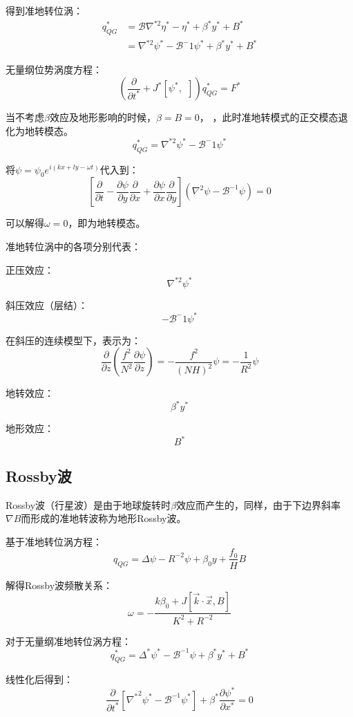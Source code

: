 \documentclass{article}
\begin{document}
得到准地转位涡：
\begin{align*}    
    q^*_{QG} & =\mathcal{B}\nabla^{*2}\eta^* - \eta^* + \beta^*y^* + B^* \\
        & = \nabla^{*2}\psi^* - \mathcal{B}^-1\psi^* + \beta^*y^*+B^*
\end{align*}

无量纲位势涡度方程：
$$\left( \frac{\partial }{\partial {{t}^{*}}}
+{{J}^{*}}\left[ {{\psi }^{*}},\ \  \right] \right)q_{QG}^{*}
={{F}^{*}}$$

当不考虑$\beta$效应及地形影响的时候，$\beta = B = 0$，
，此时准地转模式的正交模态退化为地转模态。
$$ q^*_{QG}= \nabla^{*2}\psi^* - \mathcal{B}^-1\psi^*$$

将$\psi = \psi_0e^{i(kx+ly-\omega t)}$代入到：
$$\left[ \frac{\partial }{\partial t}-\frac{\partial \psi }{\partial y}\frac{\partial }{\partial x}+\frac{\partial \psi }{\partial x}\frac{\partial }{\partial y} \right]\left( {{\nabla }^{2}}\psi -{{\mathcal{B}}^{-1}}\psi  \right)=0$$

可以解得$\omega = 0$，即为地转模态。

准地转位涡中的各项分别代表：

正压效应：
$$ \nabla^{*2}\psi^* $$

斜压效应（层结）：
$$- \mathcal{B}^-1\psi^*$$

在斜压的连续模型下，表示为：
$$\frac{\partial}{\partial z}(\frac{f^2}{N^2}\frac{\partial\psi}{\partial z})
= -\frac{f^2}{(NH)^2}\psi
= -\frac{1}{R^2}\psi$$

地转效应：
$$\beta^*y^*$$

地形效应：
$$B^*$$


\subsection{Rossby波}
Rossby波（行星波）是由于地球旋转时$\beta$效应而产生的，同样，由于下边界斜率$\nabla B$而形成的准地转波称为地形Rossby波。

基于准地转位涡方程：
$$q_{QG} = \Delta \psi-R^{-2}\psi+\beta_0y+\frac{f_0}{H}B$$

解得Rossby波频散关系：
$$\omega = -\frac{k\beta_0+J[\vec{k}\cdot\vec{x}, B]}{K^2+R^{-2}}$$

对于无量纲准地转位涡方程：
$$q_{QG}^* = \Delta^*\psi^*-\mathcal{B}^{-1}\psi+\beta^*y^*+B^*$$

线性化后得到：
$$\frac{\partial }{\partial {{t}^{*}}}\left[ {{\nabla }^{*}}^{2}{{\psi }^{*}}-{{\mathcal{B}}^{-1}}{{\psi }^{*}} \right]+{{\beta }^{*}}\frac{\partial {{\psi }^{*}}}{\partial {{x}^{*}}}=0$$
\end{document}
